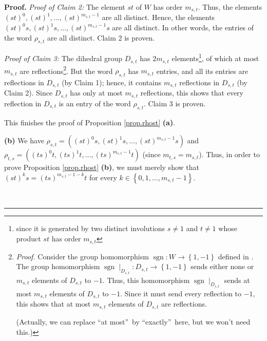 \documentclass[numbers=enddot,12pt,final,onecolumn,notitlepage,abstracton]{scrartcl}%
\theoremstyle{definition}
\newenvironment{proof}[1][Proof]{\noindent\textbf{#1.} }{\ \rule{0.5em}{0.5em}}
\begin{document}
\begin{proof}
\textit{Proof of Claim 2:} The element $st$ of $W$ has order $m_{s,t}$. Thus,
the elements $\left(  st\right)  ^{0},\left(  st\right)  ^{1},\ldots,\left(
st\right)  ^{m_{s,t}-1}$ are all distinct. Hence, the elements $\left(
st\right)  ^{0}s,\left(  st\right)  ^{1}s,\ldots,\left(  st\right)
^{m_{s,t}-1}s$ are all distinct. In other words, the entries of the word
$\rho_{s,t}$ are all distinct. Claim 2 is proven.

\textit{Proof of Claim 3:} The dihedral group $D_{s,t}$ has $2m_{s,t}$
elements\footnote{since it is generated by two distinct involutions $s\neq1$
and $t\neq1$ whose product $st$ has order $m_{s,t}$}, of which at most
$m_{s,t}$ are reflections\footnote{\textit{Proof.} Consider the group
homomorphism $\operatorname*{sgn}:W\rightarrow\left\{  1,-1\right\}  $ defined
in \cite[\S 1.1]{Lusztig-Hecke}. The group homomorphism $\operatorname*{sgn}%
\mid_{D_{s,t}}:D_{s,t}\rightarrow\left\{  1,-1\right\}  $ sends either none or
$m_{s,t}$ elements of $D_{s,t}$ to $-1$. Thus, this homomorphism
$\operatorname*{sgn}\mid_{D_{s,t}}$ sends at most $m_{s,t}$ elements of
$D_{s,t}$ to $-1$. Since it must send every reflection to $-1$, this shows
that at most $m_{s,t}$ elements of $D_{s,t}$ are reflections.
\par
(Actually, we can replace \textquotedblleft at most\textquotedblright\ by
\textquotedblleft exactly\textquotedblright\ here, but we won't need this.)}.
But the word $\rho_{s,t}$ has $m_{s,t}$ entries, and all its entries are
reflections in $D_{s,t}$ (by Claim 1); hence, it contains $m_{s,t}$
reflections in $D_{s,t}$ (by Claim 2). Since $D_{s,t}$ has only at most
$m_{s,t}$ reflections, this shows that every reflection in $D_{s,t}$ is an
entry of the word $\rho_{s,t}$. Claim 3 is proven.

This finishes the proof of Proposition \ref{prop.rhost} \textbf{(a)}. \medskip

\textbf{(b)} We have $\rho_{s,t}=\left(  \left(  st\right)  ^{0}s,\left(
st\right)  ^{1}s,\ldots,\left(  st\right)  ^{m_{s,t}-1}s\right)  $ and
\newline$\rho_{t,s}=\left(  \left(  ts\right)  ^{0}t,\left(  ts\right)
^{1}t,\ldots,\left(  ts\right)  ^{m_{s,t}-1}t\right)  $ (since $m_{t,s}%
=m_{s,t}$). Thus, in order to prove Proposition \ref{prop.rhost} \textbf{(b)},
we must merely show that $\left(  st\right)  ^{k}s=\left(  ts\right)
^{m_{s,t}-1-k}t$ for every $k\in\left\{  0,1,\ldots,m_{s,t}-1\right\}  $.


\end{proof}
\end{document}
